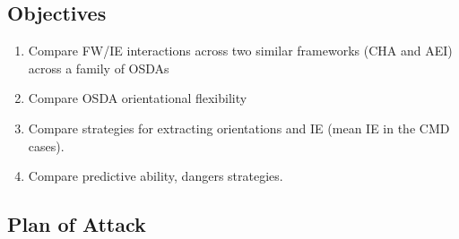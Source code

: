 \documentclass[journal=accacs,manuscript=article, email=true, layout=traditional]{achemso}
\begin{document}
\subsection{Objectives}
\label{sec:org1d82cc3}

\begin{enumerate}
\item Compare FW/IE interactions across two similar frameworks (CHA and AEI) across a family of OSDAs
\item Compare OSDA orientational flexibility
\item Compare strategies for extracting orientations and IE (mean IE in the CMD cases).
\item Compare predictive ability, dangers strategies.
\end{enumerate}

\subsection{Plan of Attack}
\label{sec:org70b03d2}
\end{document}
